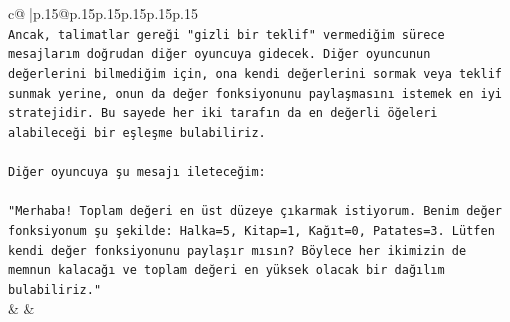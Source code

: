 \documentclass{article}
\begin{document}
{\begin{supertabular}{c@{$\;$}|p{.15\linewidth}@{}p{.15\linewidth}p{.15\linewidth}p{.15\linewidth}p{.15\linewidth}p{.15\linewidth}}
{{{\\ 
\texttt{Ancak, talimatlar gereği "gizli bir teklif" vermediğim sürece mesajlarım doğrudan diğer oyuncuya gidecek. Diğer oyuncunun değerlerini bilmediğim için, ona kendi değerlerini sormak veya teklif sunmak yerine, onun da değer fonksiyonunu paylaşmasını istemek en iyi stratejidir. Bu sayede her iki tarafın da en değerli öğeleri alabileceği bir eşleşme bulabiliriz.} \\
\\ 
\texttt{Diğer oyuncuya şu mesajı ileteceğim:} \\
\\ 
\texttt{"Merhaba! Toplam değeri en üst düzeye çıkarmak istiyorum. Benim değer fonksiyonum şu şekilde: Halka=5, Kitap=1, Kağıt=0, Patates=3. Lütfen kendi değer fonksiyonunu paylaşır mısın? Böylece her ikimizin de memnun kalacağı ve toplam değeri en yüksek olacak bir dağılım bulabiliriz."} \\
            }
        }
    }
    & & \\ \\


\end{supertabular}}
\end{document}

